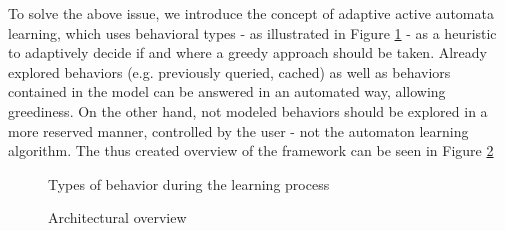 To solve the above issue, we introduce the concept of adaptive active automata learning, which uses behavioral types - as illustrated in Figure \ref{fig_architcture_commandhandling} - as a heuristic to adaptively decide if and where a greedy approach should be taken. Already explored behaviors (e.g. previously queried, cached) as well as behaviors contained in the model can be answered in an automated way, allowing greediness. On the other hand, not modeled behaviors should be explored in a more reserved manner, controlled by the user - not the automaton learning algorithm. The thus created overview of the framework can be seen in Figure \ref{fig_architcture_informaloverview_complete}

\begin{figure}[!ht] 
	\centering
	\caption{Types of behavior during the learning process} 
	\label{fig_architcture_commandhandling}
\end{figure} 

\begin{figure}[!ht] 
	\centering
	\caption{Architectural overview}
	\label{fig_architcture_informaloverview_complete}
\end{figure}



